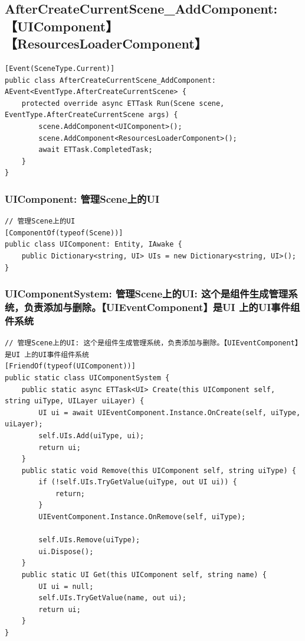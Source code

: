 \documentclass[9pt, b5paper]{article}
\begin{document}
\subsection{AfterCreateCurrentScene\_AddComponent:【UIComponent】【ResourcesLoaderComponent】}
\label{sec-1-3}
\begin{verbatim}
[Event(SceneType.Current)]
public class AfterCreateCurrentScene_AddComponent: AEvent<EventType.AfterCreateCurrentScene> {
    protected override async ETTask Run(Scene scene, EventType.AfterCreateCurrentScene args) {
        scene.AddComponent<UIComponent>();
        scene.AddComponent<ResourcesLoaderComponent>();
        await ETTask.CompletedTask;
    }
}
\end{verbatim}
\subsubsection{UIComponent: 管理Scene上的UI}
\label{sec-1-3-1}
\begin{verbatim}
// 管理Scene上的UI
[ComponentOf(typeof(Scene))]
public class UIComponent: Entity, IAwake {
    public Dictionary<string, UI> UIs = new Dictionary<string, UI>();
}
\end{verbatim}
\subsubsection{UIComponentSystem: 管理Scene上的UI: 这个是组件生成管理系统，负责添加与删除。【UIEventComponent】是UI 上的UI事件组件系统}
\label{sec-1-3-2}
\begin{verbatim}
// 管理Scene上的UI: 这个是组件生成管理系统，负责添加与删除。【UIEventComponent】是UI 上的UI事件组件系统
[FriendOf(typeof(UIComponent))]
public static class UIComponentSystem {
    public static async ETTask<UI> Create(this UIComponent self, string uiType, UILayer uiLayer) {
        UI ui = await UIEventComponent.Instance.OnCreate(self, uiType, uiLayer);
        self.UIs.Add(uiType, ui);
        return ui;
    }
    public static void Remove(this UIComponent self, string uiType) {
        if (!self.UIs.TryGetValue(uiType, out UI ui)) {
            return;
        }
        UIEventComponent.Instance.OnRemove(self, uiType);

        self.UIs.Remove(uiType);
        ui.Dispose();
    }
    public static UI Get(this UIComponent self, string name) {
        UI ui = null;
        self.UIs.TryGetValue(name, out ui);
        return ui;
    }
}
\end{verbatim}
\end{document}
